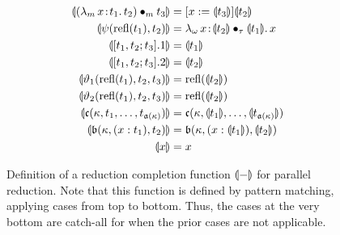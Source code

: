 

\begin{figure}
    \centering
    \begin{align*}
        \llparenthesis {({\lambda_m}\, x\! : \! t_1.\, t_2) \bullet_{m} t_3} \rrparenthesis &= [x := \llparenthesis {t_3} \rrparenthesis]\llparenthesis {t_2} \rrparenthesis \\
        \llparenthesis {\psi(\text{refl}(t_1), t_2)} \rrparenthesis &= {\lambda_\omega}\, x\! : \! \llparenthesis {t_2} \rrparenthesis \bullet_{\tau} \llparenthesis {t_1} \rrparenthesis.\, x \\
        \llparenthesis {[t_1, t_2; t_3].1} \rrparenthesis &= \llparenthesis {t_1} \rrparenthesis \\
        \llparenthesis {[t_1, t_2; t_3].2} \rrparenthesis &= \llparenthesis {t_2} \rrparenthesis \\
        \llparenthesis {\vartheta_1(\text{refl}(t_1), t_2, t_3)} \rrparenthesis &= \text{refl}(\llparenthesis {t_2} \rrparenthesis) \\
        \llparenthesis {\vartheta_2(\text{refl}(t_1), t_2, t_3)} \rrparenthesis &= \text{refl}(\llparenthesis {t_2} \rrparenthesis) \\
        \llparenthesis {\mathfrak{c}(\kappa, t_1, \ldots, t_{\mathfrak{a}(\kappa)})} \rrparenthesis &= \mathfrak{c}(\kappa, \llparenthesis {t_1} \rrparenthesis, \ldots, \llparenthesis {t_{\mathfrak{a}(\kappa)}} \rrparenthesis) \\
        \llparenthesis {\mathfrak{b}(\kappa, (x : t_1), t_2)} \rrparenthesis &= \mathfrak{b}(\kappa, (x : \llparenthesis {t_1} \rrparenthesis), \llparenthesis {t_2} \rrparenthesis) \\
        \llparenthesis {x} \rrparenthesis &= x
    \end{align*}
    \caption{
        Definition of a reduction completion function $\llparenthesis {-} \rrparenthesis$ for parallel reduction.
        Note that this function is defined by pattern matching, applying cases from top to bottom.
        Thus, the cases at the very bottom are catch-all for when the prior cases are not applicable.
    }
\end{figure}
